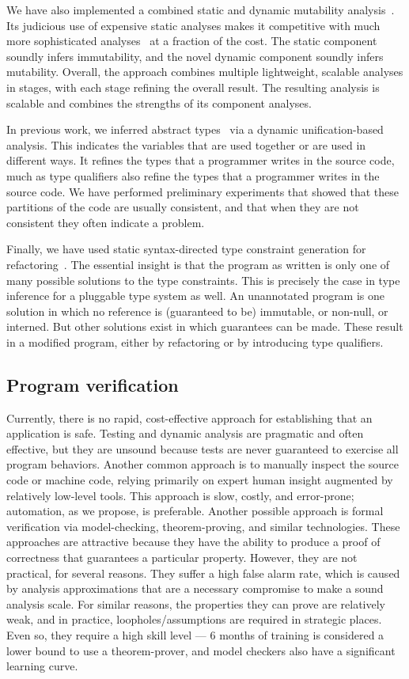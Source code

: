 \documentclass{sig-alternate}
\begin{document}
We have also implemented a combined static and dynamic mutability
analysis~\cite{ArtziKGE2007}.  Its judicious
use of expensive static analyses makes it competitive with much more
sophisticated analyses~\cite{SalcianuR2005} at a fraction of the cost.  The
static component soundly infers immutability, and the novel dynamic
component soundly infers mutability.  Overall, the approach combines
multiple lightweight, scalable analyses in stages, with each stage refining
the overall result.  The resulting analysis is scalable and combines the
strengths of its component analyses.

In previous work, we inferred abstract types~\cite{GuoPME2006} via a
dynamic unification-based analysis.  This indicates the variables that are
used together or are used in different ways.  It refines the types that
a programmer writes in the source code, much as type qualifiers also refine
the types that a programmer writes in the source code.  We have performed
preliminary experiments that showed that these partitions of the code are
usually consistent, and that when they are not consistent they often
indicate a problem.

Finally, we have used static syntax-directed type constraint generation for
refactoring~\cite{DonovanKTE2004,KiezunETF2007}.  The essential insight is
that the program as written is only one of many possible solutions to the
type constraints.  This is precisely the case in type inference for a
pluggable type system as well.  An unannotated program is one solution in
which no reference is (guaranteed to be) immutable, or non-null, or
interned.  But other solutions exist in which guarantees can be made.
These result in a modified program, either by refactoring or by introducing
type qualifiers.


\subsection{Program verification}

Currently, there is no rapid, cost-effective approach for establishing that
an application is safe.  Testing and dynamic analysis are pragmatic and
often effective, but they are unsound because tests are never guaranteed
to exercise all program behaviors.
Another common approach is to manually inspect the source code
or machine code, relying primarily on expert human insight augmented by
relatively low-level tools.  This approach is slow, costly, and
error-prone; automation, as we propose, is preferable.  Another possible
approach is formal verification via model-checking, theorem-proving, and
similar technologies.  These approaches are attractive because they have
the ability to produce a proof of correctness that guarantees a particular
property.  However, they are not practical, for several reasons.  They
suffer a high false alarm rate, which is caused by analysis approximations
that are a necessary compromise to make a sound analysis scale.  For
similar reasons, the properties they can prove are relatively weak, and in
practice, loopholes/assumptions are required in strategic places.  Even so, they
require a high skill level --- 6 months of training is considered a lower
bound to use a theorem-prover, and model checkers also have a significant
learning curve.
\end{document}
